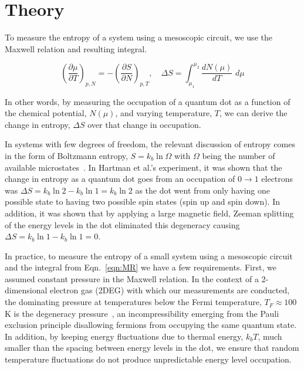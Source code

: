 
\chapter{Theory}
\label{ch:Theory}

To measure the entropy of a system using a mesoscopic circuit, we use the Maxwell relation and resulting integral.

\begin{equation}
	\label{eqn:MR}
	\left( \frac{\partial \mu }{\partial T} \right)_{p,N} = -\left( \frac{\partial S}{\partial N} \right)_{p,T} , \quad
	\Delta S = \int_{\mu_1}^{\mu_2} \frac{dN(\mu)}{dT}\,\, d\mu
\end{equation}


In other words, by measuring the occupation of a quantum dot as a function of the chemical potential, $N(\mu)$, and varying temperature, $T$, we can derive the change in entropy, $\Delta S$ over that change in occupation.

In systems with few degrees of freedom, the relevant discussion of entropy comes in the form of Boltzmann entropy, $S = k_b \ln \Omega$ with $\Omega$ being the number of available microstates~\cite{schroeder}. In Hartman et al.'s experiment, it was shown that the change in entropy as a quantum dot goes from an occupation of $0 \to 1$ electrons was $\Delta S = k_b \ln 2 - k_b \ln 1 = k_b \ln 2$ as the dot went from only having one possible state to having two possible spin states (spin up and spin down). In addition, it was shown that by applying a large magnetic field, Zeeman splitting of the energy levels in the dot eliminated this degeneracy causing $\Delta S = k_b \ln 1 - k_b \ln 1 = 0$.

In practice, to measure the entropy of a small system using a mesoscopic circuit and the integral from Eqn.~\ref{eqn:MR} we have a few requirements. First, we assumed constant pressure in the Maxwell relation. In the context of a 2-dimensional electron gas (2DEG) with which our measurements are conducted, the dominating pressure at temperatures below the Fermi temperature, $T_F \approx 100$K is the degeneracy pressure~\cite{ashcroftmermin}, an incompressibility emerging from the Pauli exclusion principle disallowing fermions from occupying the same quantum state. In addition, by keeping energy fluctuations due to thermal energy, $k_bT$, much smaller than the spacing between energy levels in the dot, we ensure that random temperature fluctuations do not produce unpredictable energy level occupation.
\endinput

Any text after an \endinput is ignored.
You could put scraps here or things in progress.
